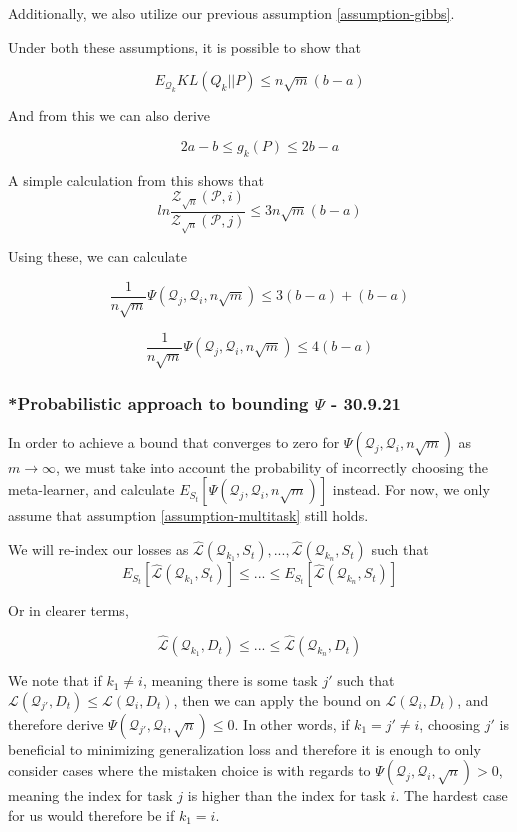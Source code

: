 \documentclass[letterpaper]{article}
\theoremstyle{definition}
\begin{document}
Additionally, we also utilize our previous assumption \ref{assumption-gibbs}.

Under both these assumptions, it is possible to show that 

$$E_{\mathcal{Q}_k} KL(Q_k||P)\leq n\sqrt{m} (b-a)$$

And from this we can also derive

$$2a-b\leq g_k(P) \leq 2b-a$$

A simple calculation from this shows that $$ln\frac{\mathcal{Z}_{\sqrt{n}}(\mathcal{P}, i)}{\mathcal{Z}_{\sqrt{n}}(\mathcal{P}, j)} \leq 3n\sqrt{m}(b-a)$$

Using these, we can calculate

$$\frac{1}{n\sqrt{m}}\Psi(\mathcal{Q}_j, \mathcal{Q}_i, n\sqrt{m})\leq 3(b-a)  + (b-a)$$ 

$$\frac{1}{n\sqrt{m}}\Psi(\mathcal{Q}_j, \mathcal{Q}_i, n\sqrt{m})\leq 4(b-a)$$ 


\subsubsection{*Probabilistic approach to bounding $\Psi$ - 30.9.21}

In order to achieve a bound that converges to zero for $\Psi(\mathcal{Q}_j, \mathcal{Q}_i, n\sqrt{m})$ as $m\rightarrow\infty$, we must take into account the probability of incorrectly choosing the meta-learner, and calculate $E_{S_t} \left [\Psi(\mathcal{Q}_j, \mathcal{Q}_i, n\sqrt{m}) \right ]$ instead. For now, we only assume that assumption \ref{assumption-multitask} still holds.

We will re-index our losses as $\hat{\mathcal{L}}(\mathcal{Q}_{k_1}, S_t), ..., \hat{\mathcal{L}}(\mathcal{Q}_{k_n}, S_t)$ such that $$E_{S_t}\left [\hat{\mathcal{L}}(\mathcal{Q}_{k_1}, S_t)\right ]\leq ... \leq E_{S_t}\left [\hat{\mathcal{L}}(\mathcal{Q}_{k_n}, S_t)\right ]$$

Or in clearer terms,

$$\hat{\mathcal{L}}(\mathcal{Q}_{k_1}, D_t)\leq ... \leq \hat{\mathcal{L}}(\mathcal{Q}_{k_n}, D_t)$$

We note that if $k_1\neq i$, meaning there is some task $j'$ such that $\mathcal{L}(\mathcal{Q}_{j'}, D_t)\leq \mathcal{L}(\mathcal{Q}_{i}, D_t)$, then we can apply the bound on $\mathcal{L}(\mathcal{Q}_{i}, D_t)$, and therefore derive $\Psi(\mathcal{Q}_{j'}, \mathcal{Q}_i, \sqrt{n})\leq 0$.
In other words, if $k_1=j'\neq i$, choosing $j'$ is beneficial to minimizing generalization loss and therefore it is enough to only consider cases where the mistaken choice is with regards to $\Psi(\mathcal{Q}_{j}, \mathcal{Q}_i, \sqrt{n})> 0$, meaning the index for task $j$ is higher than the index for task $i$. The hardest case for us would therefore be if $k_1=i$.
\end{document}
